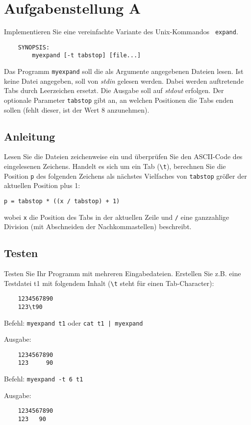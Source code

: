 




\section*{Aufgabenstellung A}
Implementieren Sie eine vereinfachte Variante des Unix-Kommandos {\tt
expand}.
\begin{verbatim}
    SYNOPSIS:
        myexpand [-t tabstop] [file...]
\end{verbatim}

Das Programm {\tt myexpand} soll die als Argumente angegebenen Dateien
lesen. Ist keine Datei angegeben, soll von {\it stdin} gelesen werden.
Dabei werden auftretende Tabs durch Leerzeichen ersetzt. Die Ausgabe
soll auf {\it stdout} erfolgen. Der optionale Parameter \verb|tabstop|
gibt an, an welchen Positionen die Tabs enden sollen (fehlt dieser,
ist der Wert 8 anzunehmen).

\subsection*{Anleitung}
Lesen Sie die Dateien zeichenweise ein und überprüfen Sie den
ASCII-Code des eingelesenen Zeichens. Handelt es sich um ein Tab
(\verb|\t|), berechnen Sie die Position \verb|p| des folgenden
Zeichens als nächstes Vielfaches von \verb|tabstop| größer der
aktuellen Position plus 1:

\verb|p = tabstop * ((x / tabstop) + 1)|

wobei \verb|x| die Position des Tabs in der aktuellen Zeile und
\verb|/| eine ganzzahlige Division (mit Abschneiden der
Nachkommastellen) beschreibt.

\subsection*{Testen}
Testen Sie Ihr Programm mit mehreren Eingabedateien. Erstellen Sie
z.B. eine Testdatei t1 mit folgendem Inhalt (\verb|\t| steht für einen
Tab-Character):
\begin{verbatim}
	1234567890
	123\t90
\end{verbatim}

Befehl: \verb!myexpand t1! oder \verb!cat t1 | myexpand!

Ausgabe:
\begin{verbatim}
	1234567890
	123     90
\end{verbatim}

Befehl: \verb!myexpand -t 6 t1!

Ausgabe:
\begin{verbatim}
	1234567890
	123   90
\end{verbatim}

\osueguidelinesone


